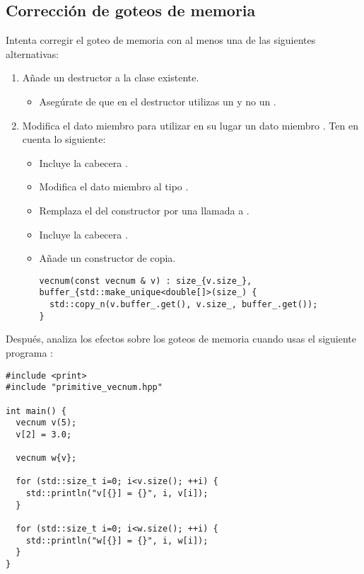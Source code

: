 \subsection{Corrección de goteos de memoria}

Intenta corregir el goteo de memoria con al menos una de las siguientes alternativas:

\begin{enumerate}

\item Añade un destructor a la clase existente.
\begin{itemize}
  \item Asegúrate de que en el destructor utilizas 
        un   
        y no un  .
\end{itemize}

\item Modifica el dato miembro  
para utilizar en su lugar un dato miembro .
Ten en cuenta lo siguiente:

\begin{itemize}
  \item Incluye la cabecera .
  \item Modifica el dato miembro  al tipo .
  \item Remplaza el  del constructor por una llamada a .
  \item Incluye la cabecera .
  \item Añade un constructor de copia.
\begin{lstlisting}
vecnum(const vecnum & v) : size_{v.size_}, buffer_{std::make_unique<double[]>(size_) {
  std::copy_n(v.buffer_.get(), v.size_, buffer_.get());
}
\end{lstlisting}
\end{itemize}

\end{enumerate}

Después, analiza los efectos sobre los goteos de memoria cuando usas el siguiente programa :

\begin{lstlisting}
#include <print>
#include "primitive_vecnum.hpp"

int main() {
  vecnum v(5);
  v[2] = 3.0;

  vecnum w{v};

  for (std::size_t i=0; i<v.size(); ++i) {
    std::println("v[{}] = {}", i, v[i]);
  }

  for (std::size_t i=0; i<w.size(); ++i) {
    std::println("w[{}] = {}", i, w[i]);
  }
}
\end{lstlisting}

